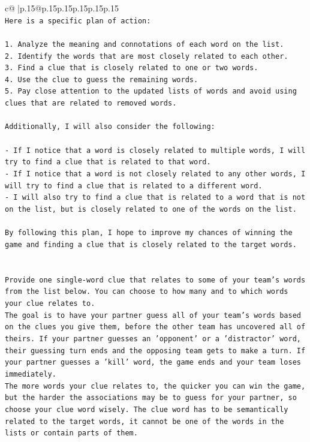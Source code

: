 \documentclass{article}
\begin{document}
{\begin{supertabular}{c@{$\;$}|p{.15\linewidth}@{}p{.15\linewidth}p{.15\linewidth}p{.15\linewidth}p{.15\linewidth}p{.15\linewidth}}
{{{\\ 
\texttt{Here is a specific plan of action:} \\
\\ 
\texttt{1. Analyze the meaning and connotations of each word on the list.} \\
\texttt{2. Identify the words that are most closely related to each other.} \\
\texttt{3. Find a clue that is closely related to one or two words.} \\
\texttt{4. Use the clue to guess the remaining words.} \\
\texttt{5. Pay close attention to the updated lists of words and avoid using clues that are related to removed words.} \\
\\ 
\texttt{Additionally, I will also consider the following:} \\
\\ 
\texttt{{-} If I notice that a word is closely related to multiple words, I will try to find a clue that is related to that word.} \\
\texttt{{-} If I notice that a word is not closely related to any other words, I will try to find a clue that is related to a different word.} \\
\texttt{{-} I will also try to find a clue that is related to a word that is not on the list, but is closely related to one of the words on the list.} \\
\\ 
\texttt{By following this plan, I hope to improve my chances of winning the game and finding a clue that is closely related to the target words.} \\
\\ 
\\ 
\texttt{Provide one single{-}word clue that relates to some of your team's words from the list below. You can choose to how many and to which words your clue relates to.} \\
\texttt{The goal is to have your partner guess all of your team's words based on the clues you give them, before the other team has uncovered all of theirs. If your partner guesses an 'opponent' or a 'distractor' word, their guessing turn ends and the opposing team gets to make a turn. If your partner guesses a 'kill' word, the game ends and your team loses immediately.} \\
\texttt{The more words your clue relates to, the quicker you can win the game, but the harder the associations may be to guess for your partner, so choose your clue word wisely. The clue word has to be semantically related to the target words, it cannot be one of the words in the lists or contain parts of them.} \\
}}}
\end{supertabular}}
\end{document}
